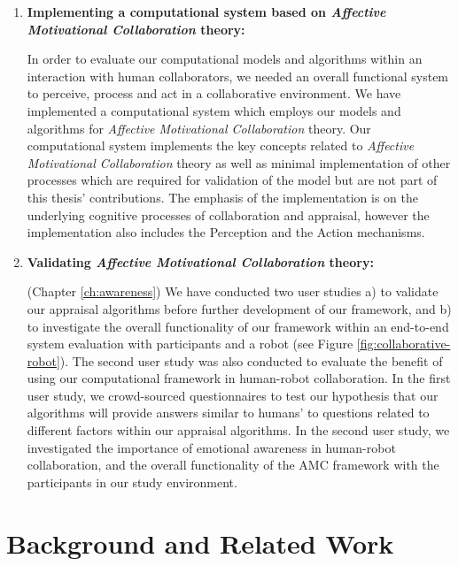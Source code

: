 \documentclass[12pt]{report}
\begin{document}
\begin{enumerate}
  \item \textbf{Implementing a computational system based on \textit{Affective
  Motivational Collaboration} theory:}

  In order to evaluate our computational models and algorithms within an
  interaction with human collaborators, we needed an overall functional system
  to perceive, process and act in a collaborative environment. We have
  implemented a computational system which employs our models and algorithms for
  \textit{Affective Motivational Collaboration} theory. Our computational system
  implements the key concepts related to \textit{Affective Motivational
  Collaboration} theory as well as minimal implementation of other processes
  which are required for validation of the model but are not part of this
  thesis' contributions. The emphasis of the implementation is on the underlying
  cognitive processes of collaboration and appraisal, however the implementation
  also includes the Perception and the Action mechanisms.

  \item \textbf{Validating \textit{Affective Motivational Collaboration}
  theory:}

  (Chapter \ref{ch:awareness}) We have conducted two user studies a) to validate
  our appraisal algorithms before further development of our framework, and b)
  to investigate the overall functionality of our framework within an end-to-end
  system evaluation with participants and a robot (see Figure
  \ref{fig:collaborative-robot}). The second user study was also conducted to
  evaluate the benefit of using our computational framework in human-robot
  collaboration. In the first user study, we crowd-sourced questionnaires to
  test our hypothesis that our algorithms will provide answers similar to
  humans' to questions related to different factors within our appraisal
  algorithms. In the second user study, we investigated the importance of
  emotional awareness in human-robot collaboration, and the overall
  functionality of the AMC framework with the participants in our study
  environment.
\end{enumerate}

\chapter{Background and Related Work}
\label{ch:background}

\vspace*{-5mm}
\end{document}
